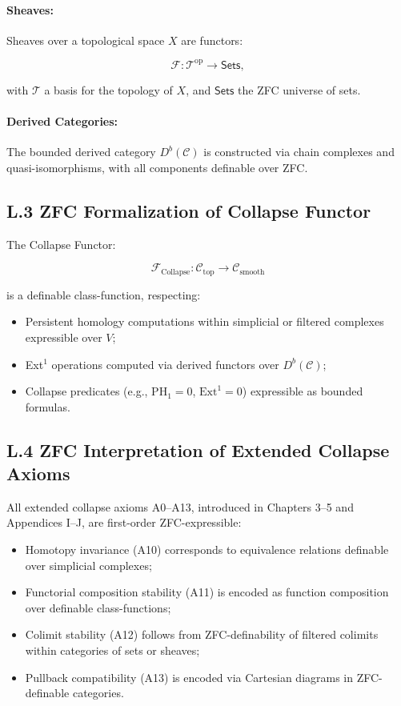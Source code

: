 \documentclass[11pt]{article}
\begin{document}
\paragraph{Sheaves:}  
Sheaves over a topological space \( X \) are functors:

\[
\mathcal{F} : \mathcal{T}^{\mathrm{op}} \to \mathsf{Sets},
\]

with \( \mathcal{T} \) a basis for the topology of \( X \), and \( \mathsf{Sets} \) the ZFC universe of sets.

\paragraph{Derived Categories:}  
The bounded derived category \( D^b(\mathcal{C}) \) is constructed via chain complexes and quasi-isomorphisms, with all components definable over ZFC.

\subsection*{L.3 ZFC Formalization of Collapse Functor}

The Collapse Functor:

\[
\mathcal{F}_{\mathrm{Collapse}} : \mathcal{C}_{\mathrm{top}} \to \mathcal{C}_{\mathrm{smooth}}
\]

is a definable class-function, respecting:

\begin{itemize}
    \item Persistent homology computations within simplicial or filtered complexes expressible over \( V \);
    \item Ext$^1$ operations computed via derived functors over \( D^b(\mathcal{C}) \);
    \item Collapse predicates (e.g., \( \mathrm{PH}_1 = 0 \), \( \mathrm{Ext}^1 = 0 \)) expressible as bounded formulas.
\end{itemize}

\subsection*{L.4 ZFC Interpretation of Extended Collapse Axioms}

All extended collapse axioms A0–A13, introduced in Chapters 3–5 and Appendices I–J, are first-order ZFC-expressible:

\begin{itemize}
    \item Homotopy invariance (A10) corresponds to equivalence relations definable over simplicial complexes;
    \item Functorial composition stability (A11) is encoded as function composition over definable class-functions;
    \item Colimit stability (A12) follows from ZFC-definability of filtered colimits within categories of sets or sheaves;
    \item Pullback compatibility (A13) is encoded via Cartesian diagrams in ZFC-definable categories.
\end{itemize}
\end{document}
